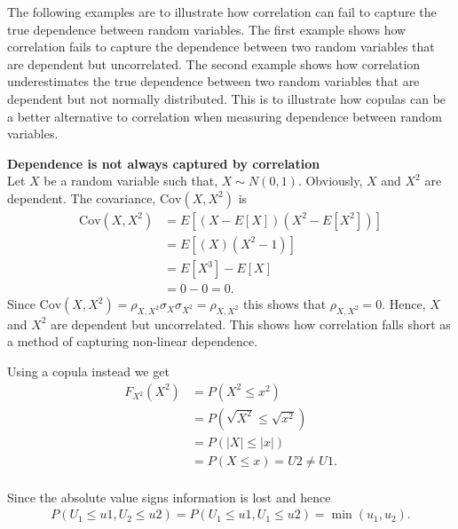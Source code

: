 The following examples are to illustrate how correlation can fail to capture the true dependence between random variables. The first example shows how correlation fails to capture the dependence between two random variables that are dependent but uncorrelated. The second example shows how correlation underestimates the true dependence between two random variables that are dependent but not normally distributed. This is to illustrate how copulas can be a better alternative to correlation when measuring dependence between random variables.

\begin{example}\label{ex:CorrelationFail}
    \textbf{Dependence is not always captured by correlation}  \\
    Let $X$ be a random variable such that, $X \sim N(0,1)$. Obviously, $X$ and $X^2$ are dependent. The covariance, $\mathrm{Cov}(X,X^2)$ is 
    \begin{align*}
        \mathrm{Cov}(X,X^2) &= E \left[  (X-E\left[  X \right])(X^2-E\left[  X^2 \right])  \right]\\
         &=  E \left[  (X)(X^2-1)  \right]\\
         &= E \left[  X^3  \right] - E \left[  X  \right]\\
         &= 0-0 = 0 .
    \end{align*}
    Since $\mathrm{Cov}(X,X^2) = \rho_{X,X^2}\sigma_{X}\sigma_{X^2} = \rho_{X,X^2}$ this shows that $\rho_{X,X^2} = 0.$
    Hence, $X$ and $X^2$ are dependent but uncorrelated. This shows how correlation falls short as a method of capturing non-linear dependence.
    
    Using a copula instead we get
    \begin{align*}
    F_{X^2}(X^2) &= P(X^2 \leq x^2)\\
    &= P(\sqrt{X^2} \leq \sqrt{x^2})\\
    &= P(|X| \leq |x| )\\    
    &=P(X\leq x) = U2 \neq U1.\\
    \end{align*}

    Since the absolute value signs information is lost and hence 
    \begin{align*}
        P(U_1\leq u1, U_2\leq u2) = P(U_1\leq u1, U_1\leq u2) = \min(u_1,u_2).
    \end{align*}
    
\end{example}


